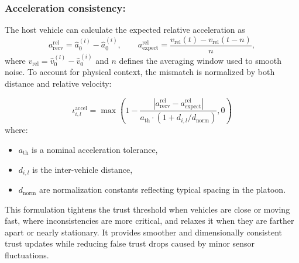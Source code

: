 \subsubsection{Acceleration consistency:}


The host vehicle can calculate the expected relative acceleration as 
\[
a_{\text{recv}}^{\text{rel}} = \hat{a}_0^{(l)} - \hat{a}_0^{(i)}, \qquad
a_{\text{expect}}^{\text{rel}} = \frac{v_{\text{rel}}(t) - v_{\text{rel}}(t-n)}{n},
\]
where \(v_{\text{rel}} = \hat{v}_0^{(l)} - \hat{v}_0^{(i)}\) and \(n\) defines the averaging window used to smooth noise.
To account for physical context, the mismatch is normalized by both distance and relative velocity:

\begin{equation}
    \iota_{i,l}^{\text{accel}} = \max\left(1 - 
    \frac{|a_{\text{recv}}^{\text{rel}} - a_{\text{expect}}^{\text{rel}}|}
    {a_{\text{th}} \cdot (1 + d_{i,l}/d_{\text{norm}})}, 0\right)
\end{equation}
where:

\begin{itemize}
\item \(a_{\text{th}}\) is a nominal acceleration tolerance,
\item \(d_{i,l}\) is the inter-vehicle distance,
\item \(d_{\text{norm}}\) are normalization constants reflecting typical spacing in the platoon.
\end{itemize}
This formulation tightens the trust threshold when vehicles are close or moving fast, where inconsistencies are more critical, and relaxes it when they are farther apart or nearly stationary. It provides smoother and dimensionally consistent trust updates while reducing false trust drops caused by minor sensor fluctuations.

